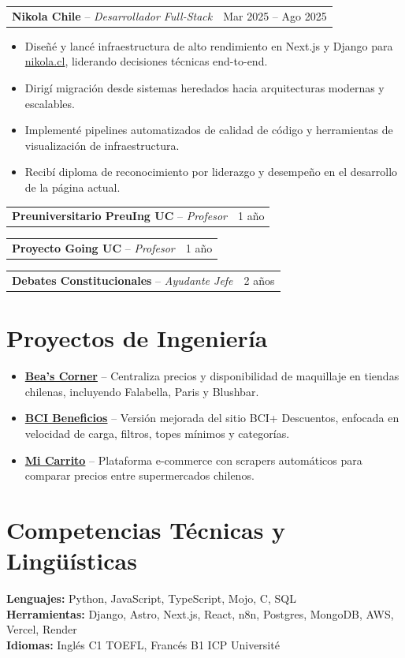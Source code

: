 \documentclass[10pt,letterpaper]{article}
\makeatletter
\newcommand{\position}[4]{%
  \begin{tabularx}{\linewidth}{@{}Xr@{}}
    \textbf{#1} -- \textit{#2} & {\color{muted}#3} \\
  \end{tabularx}
  #4
}
\makeatother
\begin{document}
\position{Nikola Chile}{Desarrollador Full-Stack}{Mar 2025 -- Ago 2025}{
\begin{itemize}
  \item Diseñé y lancé infraestructura de alto rendimiento en Next.js y Django para \href{https://www.nikola.cl}{nikola.cl}, liderando decisiones técnicas end-to-end.
  \item Dirigí migración desde sistemas heredados hacia arquitecturas modernas y escalables.
  \item Implementé pipelines automatizados de calidad de código y herramientas de visualización de infraestructura.
  \item Recibí diploma de reconocimiento por liderazgo y desempeño en el desarrollo de la página actual.
\end{itemize}}

\position{Preuniversitario PreuIng UC}{Profesor}{1 año}{}
\position{Proyecto Going UC}{Profesor}{1 año}{}
\position{Debates Constitucionales}{Ayudante Jefe}{2 años}{}

\section{Proyectos de Ingeniería}
\begin{itemize}
  \item \textbf{\href{https://beascorner.onrender.com/}{Bea's Corner}} -- Centraliza precios y disponibilidad de maquillaje en tiendas chilenas, incluyendo Falabella, Paris y Blushbar.
  \item \textbf{\href{https://bcibeneficios.onrender.com/}{BCI Beneficios}} -- Versión mejorada del sitio BCI+ Descuentos, enfocada en velocidad de carga, filtros, topes mínimos y categorías.
  \item \textbf{\href{https://micarritochile.vercel.app/}{Mi Carrito}} -- Plataforma e-commerce con scrapers automáticos para comparar precios entre supermercados chilenos.
\end{itemize}

\section{Competencias Técnicas y Lingüísticas}
\textbf{Lenguajes:} Python, JavaScript, TypeScript, Mojo, C, SQL \\
\textbf{Herramientas:} Django, Astro, Next.js, React, n8n, Postgres, MongoDB, AWS, Vercel, Render \\
\textbf{Idiomas:} Inglés C1 TOEFL, Francés B1 ICP Université
\end{document}
